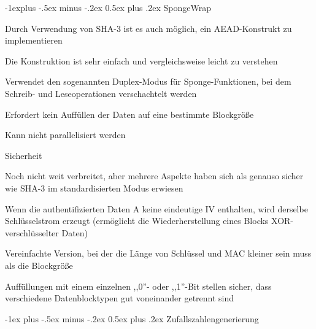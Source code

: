 \documentclass[a4paper]{article}
\makeatletter
\renewcommand{\section}{\@startsection{section}{1}{0mm}%
 {-1ex plus -.5ex minus -.2ex}%
 {0.5ex plus .2ex}%
 {\normalfont\large\bfseries}}
\renewcommand{\subsection}{\@startsection{subsection}{2}{0mm}%
 {-1explus -.5ex minus -.2ex}%
 {0.5ex plus .2ex}%
 {\normalfont\normalsize\bfseries}}
\makeatother
\begin{document}
\begin{multicols}{3}
      \subsection{SpongeWrap}
      \begin{itemize*}
            \item Durch Verwendung von SHA-3 ist es auch möglich, ein AEAD-Konstrukt zu implementieren
            \item Die Konstruktion ist sehr einfach und vergleichsweise leicht zu verstehen
            \item Verwendet den sogenannten Duplex-Modus für Sponge-Funktionen, bei dem Schreib- und Leseoperationen verschachtelt werden
            \item Erfordert kein Auffüllen der Daten auf eine bestimmte Blockgröße
            \item Kann nicht parallelisiert werden
            \item Sicherheit
            \begin{itemize*}
                  \item Noch nicht weit verbreitet, aber mehrere Aspekte haben sich als genauso sicher wie SHA-3 im standardisierten Modus erwiesen
                  \item Wenn die authentifizierten Daten A keine eindeutige IV enthalten, wird derselbe Schlüsselstrom erzeugt (ermöglicht die Wiederherstellung eines Blocks XOR-verschlüsselter Daten)
                  \item Vereinfachte Version, bei der die Länge von Schlüssel und MAC kleiner sein muss als die Blockgröße
                  \item Auffüllungen mit einem einzelnen ,,0''- oder ,,1''-Bit stellen sicher, dass verschiedene Datenblocktypen gut voneinander getrennt sind
            \end{itemize*}
      \end{itemize*}

      \section{Zufallszahlengenerierung}

\end{multicols}
\end{document}
